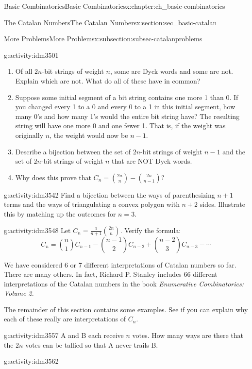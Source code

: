 \documentclass[oneside,10pt,]{book}
\numberwithin{equation}{chapter}
\begin{document}
\begin{chapterptx}{Basic Combinatorics}{}{Basic Combinatorics}{}{}{x:chapter:ch_basic-combinatorics}
\begin{sectionptx}{The Catalan Numbers}{}{The Catalan Numbers}{}{}{x:section:sec_basic-catalan}
\begin{subsectionptx}{More Problems}{}{More Problems}{}{}{x:subsection:subsec-catalanproblems}
\begin{activity}{}{g:activity:idm3501}
\begin{enumerate}[font=\bfseries,label=(\alph*),ref=\alph*]
\item{}Of all \(2n\)-bit strings of weight \(n\), some are Dyck words and some are not.  Explain which are not.  What do all of these have in common?%
\item{}Suppose some initial segment of a bit string contains one more 1 than 0.  If you changed every 1 to a 0 and every 0 to a 1 in this initial segment, how many 0's and how many 1's would the entire bit string have?%
The resulting string will have one more 0 and one fewer 1.  That is, if the weight was originally \(n\), the weight would now be \(n-1\).%
\item{}Describe a bijection between the set of \(2n\)-bit strings of weight \(n-1\) and the set of \(2n\)-bit strings of weight \(n\) that are NOT Dyck words.%
\item{}Why does this prove that \(C_n = \binom{2n}{n} - \binom{2n}{n-1}\)?%
\end{enumerate}
\end{activity}
\begin{activity}{}{g:activity:idm3542}%
Find a bijection between the ways of parenthesizing \(n+1\) terms and the ways of triangulating a convex polygon with \(n+2\) sides.  Illustrate this by matching up the outcomes for \(n = 3\).%
\end{activity}
\begin{activity}{}{g:activity:idm3548}%
Let \(C_{n} = \frac{1}{n + 1}\binom{2n}{n}\). Verify the formula:%
\begin{equation*}
C_{n} = \binom{n}{1} C_{n - 1} - \binom{n - 1}{2} C_{n - 2} + \binom{n - 2}{3} C_{n - 3} - \cdots
\end{equation*}
%
\end{activity}
We have considered 6 or 7 different interpretations of Catalan numbers so far.  There are many others.  In fact, Richard P. Stanley includes 66 different interpretations of the Catalan numbers in the book \emph{Enumerative Combinatorics: Volume 2}.%
\par
The remainder of this section contains some examples.  See if you can explain why each of these really are interpretations of \(C_n\).%
\begin{activity}{}{g:activity:idm3557}%
A and B each receive \(n\) votes. How many ways are there that the \(2n\) votes can be tallied so that A never trails B.%
\end{activity}
\begin{activity}{}{g:activity:idm3562}%

\end{activity}
\end{subsectionptx}
\end{sectionptx}
\end{chapterptx}
\end{document}

